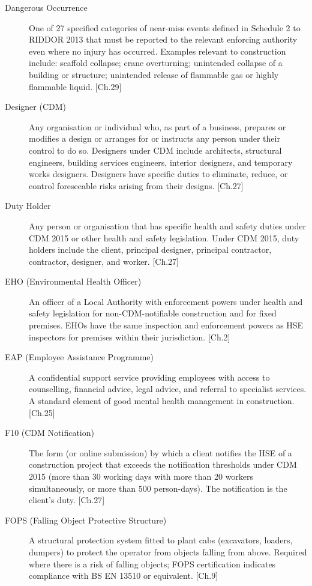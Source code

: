 \begin{description}
\item[Dangerous Occurrence] One of 27 specified categories of near-miss events defined in Schedule 2 to RIDDOR 2013 that must be reported to the relevant enforcing authority even where no injury has occurred. Examples relevant to construction include: scaffold collapse; crane overturning; unintended collapse of a building or structure; unintended release of flammable gas or highly flammable liquid. [Ch.29]

\item[Designer (CDM)] Any organisation or individual who, as part of a business, prepares or modifies a design or arranges for or instructs any person under their control to do so. Designers under CDM include architects, structural engineers, building services engineers, interior designers, and temporary works designers. Designers have specific duties to eliminate, reduce, or control foreseeable risks arising from their designs. [Ch.27]

\item[Duty Holder] Any person or organisation that has specific health and safety duties under CDM 2015 or other health and safety legislation. Under CDM 2015, duty holders include the client, principal designer, principal contractor, contractor, designer, and worker. [Ch.27]

\item[EHO (Environmental Health Officer)] An officer of a Local Authority with enforcement powers under health and safety legislation for non-CDM-notifiable construction and for fixed premises. EHOs have the same inspection and enforcement powers as HSE inspectors for premises within their jurisdiction. [Ch.2]

\item[EAP (Employee Assistance Programme)] A confidential support service providing employees with access to counselling, financial advice, legal advice, and referral to specialist services. A standard element of good mental health management in construction. [Ch.25]

\item[F10 (CDM Notification)] The form (or online submission) by which a client notifies the HSE of a construction project that exceeds the notification thresholds under CDM 2015 (more than 30 working days with more than 20 workers simultaneously, or more than 500 person-days). The notification is the client's duty. [Ch.27]

\item[FOPS (Falling Object Protective Structure)] A structural protection system fitted to plant cabs (excavators, loaders, dumpers) to protect the operator from objects falling from above. Required where there is a risk of falling objects; FOPS certification indicates compliance with BS EN 13510 or equivalent. [Ch.9]


\end{description}

